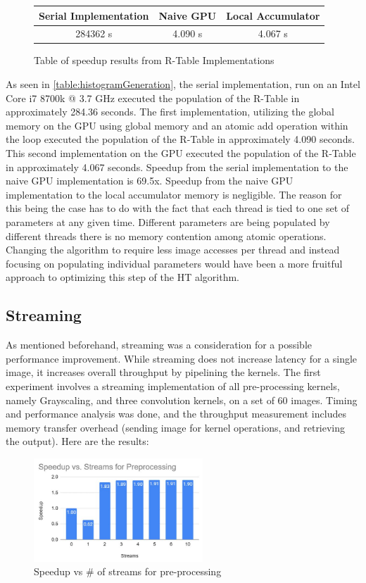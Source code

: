\documentclass[12pt]{article}
\begin{document}
\begin{figure}[h]
\begin{center}
\begin{tabular}{ |c|c|c| } 
 \hline
 Serial Implementation & Naive GPU & Local Accumulator \\ 
 \hline
 284362 s & 4.090 s & 4.067 s \\
 \hline
\end{tabular}\caption{Table of speedup results from R-Table Implementations}\label{table:histogramGeneration}
\end{center}
\end{figure}

As seen in \autoref{table:histogramGeneration}, the serial implementation, run on an Intel Core i7 8700k @ 3.7 GHz executed the population of the R-Table in approximately 284.36 seconds.
The first implementation, utilizing the global memory on the GPU using global memory and an atomic add operation within the loop executed the population of the R-Table in approximately 4.090 seconds.
This second implementation on the GPU executed the population of the R-Table in approximately 4.067 seconds.
Speedup from the serial implementation to the naive GPU implementation is 69.5x.
Speedup from the naive GPU implementation to the local accumulator memory is negligible. 
The reason for this being the case has to do with the fact that each thread is tied to one set of parameters at any given time.
Different parameters are being populated by different threads there is no memory contention among atomic operations. 
Changing the algorithm to require less image accesses per thread and instead focusing on populating individual parameters would have been a more fruitful approach to optimizing this step of the HT algorithm.\label{section:histogramGeneration}


\subsection{Streaming}
As mentioned beforehand, streaming was a consideration for a possible performance improvement. While streaming does not increase latency for a single image, it increases overall throughput by pipelining the kernels. The first experiment involves a streaming implementation of all pre-processing kernels, namely Grayscaling, and three convolution kernels, on a set of 60 images. Timing and performance analysis was done, and the throughput measurement includes memory transfer overhead (sending image for kernel operations, and retrieving the output). Here are the results:
\begin{figure}[ht]
\centering
\includegraphics[width=2.5in]{figures/StreamingPreProcessing}\caption{Speedup vs \# of streams for pre-processing}\label{figure:streamPreProcess}
\end{figure}
\end{document}

